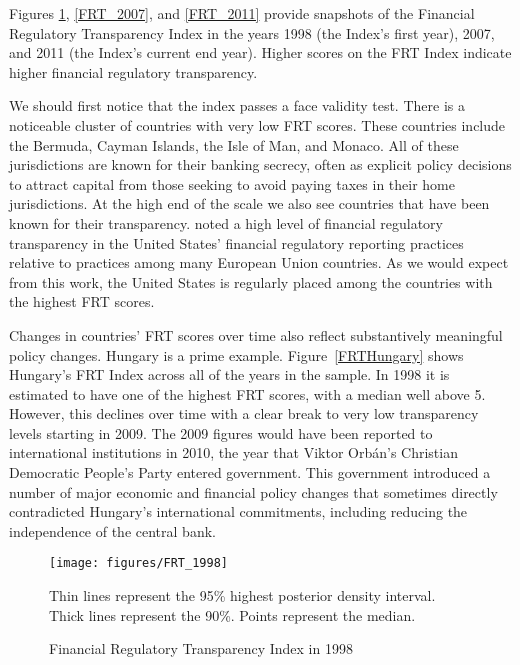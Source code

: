 \documentclass[a4paper]{article}
\begin{document}
Figures \ref{FRT_1998}, \ref{FRT_2007}, and \ref{FRT_2011} provide snapshots of the Financial Regulatory Transparency Index in the years 1998 (the Index's first year), 2007, and 2011 (the Index's current end year). Higher scores on the FRT Index indicate higher financial regulatory transparency.

We should first notice that the index passes a face validity test. There is a noticeable cluster of countries with very low FRT scores. These countries include the Bermuda, Cayman Islands, the Isle of Man, and Monaco. All of these jurisdictions are known for their banking secrecy, often as explicit policy decisions to attract capital from those seeking to avoid paying taxes in their home jurisdictions. At the high end of the scale we also see countries that have been known for their transparency. \cite{Gandrud2014a} noted a high level of financial regulatory transparency in the United States' financial regulatory reporting practices relative to practices among many European Union countries. As we would expect from this work, the United States is regularly placed among the countries with the highest FRT scores.  

Changes in countries' FRT scores over time also reflect substantively meaningful policy changes. Hungary is a prime example. Figure~\ref{FRTHungary} shows Hungary's FRT Index across all of the years in the sample. In 1998 it is estimated to have one of the highest FRT scores, with a median well above 5. However, this declines over time with a clear break to very low transparency levels starting in 2009. The 2009 figures would have been reported to international institutions in 2010, the year that Viktor Orb\'{a}n's Christian Democratic People's Party entered government. This government introduced a number of major economic and financial policy changes that sometimes directly contradicted Hungary's international commitments, including reducing the independence of the central bank. 

\begin{figure}
    \caption{Financial Regulatory Transparency Index in 1998}
    \label{FRT_1998}
    \begin{center}
        \texttt{[image: figures/FRT\_1998]}
    \end{center}
    {\scriptsize{Thin lines represent the 95\% highest posterior density interval. Thick lines represent the 90\%. Points represent the median.}}
\end{figure}
\end{document}
